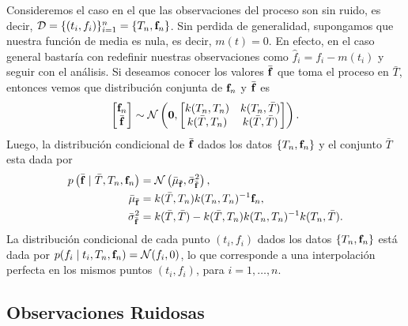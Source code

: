 Consideremos el caso en el que las observaciones del proceso son sin ruido, es decir, \(\mathcal{D} = \{(t_i, f_i)\}_{i=1}^n = \{T_n, \mathbf{f}_n\}\). Sin perdida de generalidad, supongamos que nuestra función de media es
nula, es decir, \(m(t) = 0\). En efecto, en el caso general bastaría con redefinir nuestras observaciones como \(\hat{f}_i = f_i - m(t_i)\) y seguir con el análisis. Si deseamos conocer los valores \(\bar{\mathbf{f}}\) que toma el proceso en \(\bar{T}\), entonces vemos que distribución conjunta de \(\mathbf{f}_{n}\) y \(\bar{\mathbf{f}}\) es
\begin{equation*}
	\begin{bmatrix}
		\mathbf{f}_{n} \\
		\bar{\mathbf{f}}
	\end{bmatrix}
	\sim \mathcal{N} \left(\mathbf{0},
	\begin{bmatrix}
		k(T_n, T_n)		& k(T_n, \bar{T})\\
		k(\bar{T}, T_n)	& k(\bar{T}, \bar{T})
	\end{bmatrix}
	\right).
\end{equation*}
Luego, la distribución condicional de \(\bar{\mathbf{f}}\) dados los datos \(\{T_n, \mathbf{f}_{n}\}\) y el conjunto \(\bar{T}\) esta dada por
\begin{align*}
	p\left(\bar{\mathbf{f}} \mid \bar{T}, T_n, \mathbf{f}_{n}\right)	&= \mathcal{N}\left(\bar{\mu}_{\bar{\mathbf{f}}}, \bar{\sigma}_{\bar{\mathbf{f}}}^2\right),\\
	\bar{\mu}_{\bar{\mathbf{f}}}									&= k(\bar{T}, T_n) k(T_n, T_n)^{-1} \mathbf{f}_{n},\\
	\bar{\sigma}_{\bar{\mathbf{f}}}^2								&= k(\bar{T}, \bar{T}) - k(\bar{T}, T_n) k(T_n, T_n)^{-1} k(T_n, \bar{T}).
\end{align*}
La distribución condicional de cada punto \((t_i, f_i)\) dados los datos \(\{T_n, \mathbf{f}_{n}\} \) está dada por \(p(f_i \mid t_i, T_n, \mathbf{f}_{n}) = \mathcal{N}(f_i, 0)\), lo que corresponde a una interpolación perfecta en los mismos puntos \((t_i, f_i)\), para \(i = 1, \dotsc, n\).

\subsection{Observaciones Ruidosas}

